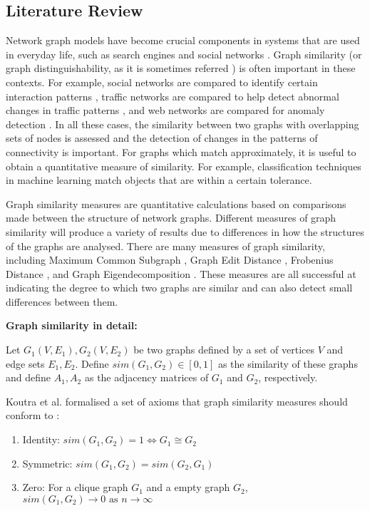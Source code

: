 \subsection{Literature Review}
Network graph models have become crucial components in systems that are used in everyday life, such as search engines and social networks \cite{social-networks}. Graph similarity (or graph distinguishability, as it is sometimes referred \cite{quantum-distinguishability}) is often important in these contexts. For example, social networks are compared to identify certain interaction patterns \cite{citation-space}, traffic networks are compared to help detect abnormal changes in traffic patterns \cite{traffic}, and web networks are compared for anomaly detection \cite{web-anomalies}. In all these cases, the similarity between two graphs with overlapping sets of nodes is assessed and the detection of changes in the patterns of connectivity is important. For graphs which match approximately, it is useful to obtain a quantitative measure of similarity. For example, classification techniques in machine learning match objects that are within a certain tolerance.

Graph similarity measures are quantitative calculations based on comparisons made between the structure of network graphs. Different measures of graph similarity will produce a variety of results due to differences in how the structures of the graphs are analysed. There are many measures of graph similarity, including Maximum Common Subgraph \cite{MCS}, Graph Edit Distance \cite{GED}, Frobenius Distance \cite{frobenius-distance}, and Graph Eigendecomposition \cite{eigendecomposition}. These measures are all successful at indicating the degree to which two graphs are similar and can also detect small differences between them. 

\textbf{Graph similarity in detail:}

Let $G_{1}(V,E_{1} ), G_{2}(V,{E}_2)$ be two graphs defined by a set of vertices $V$ and edge sets $E_{1},E_{2}$. Define $sim(G_{1},G_{2} )\in[0,1]$ as the similarity of these graphs and define $A_{1},A_{2}$ as the adjacency matrices of $G_{1}$ and $G_{2}$, respectively. 

Koutra et al. formalised a set of axioms that graph similarity measures should conform to \cite{deltacon}:
\begin{enumerate}
    \item Identity: $sim(G_{1},G_{2})=1 \iff G_{1} \cong G_{2}$
    \item Symmetric:  $sim(G_{1},G_{2})=sim(G_{2},G_{1})$
    \item Zero: For a clique graph $G_{1}$ and a empty graph $G_{2}$, $sim(G_{1},G_{2}) \rightarrow 0 \text{ as } n\rightarrow \infty$ 
\end{enumerate}

